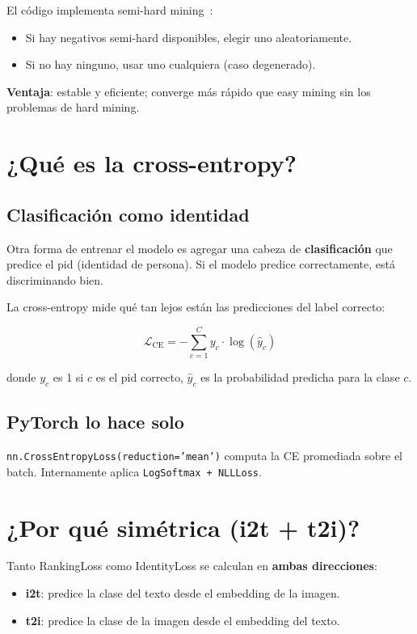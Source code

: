 El código implementa semi-hard mining~\cite{schroff2015facenet}:
\begin{itemize}
  \item Si hay negativos semi-hard disponibles, elegir uno
    aleatoriamente.
  \item Si no hay ninguno, usar uno cualquiera (caso
    degenerado).
\end{itemize}

\noindent\textbf{Ventaja}: estable y eficiente; converge más
rápido que easy mining sin los problemas de hard mining.

\section{¿Qué es la cross-entropy?}

\subsection{Clasificación como identidad}

Otra forma de entrenar el modelo es agregar una cabeza de
\textbf{clasificación} que predice el pid (identidad de persona).
Si el modelo predice correctamente, está discriminando bien.

La cross-entropy mide qué tan lejos están las predicciones del
label correcto:

\begin{equation}
  \mathcal{L}_{\text{CE}} = -\sum_{c=1}^{C} y_c \cdot \log(\hat{y}_c)
  \label{eq:ce}
\end{equation}

\noindent donde $y_c$ es 1 si $c$ es el pid correcto, $\hat{y}_c$ es
la probabilidad predicha para la clase $c$.

\subsection{PyTorch lo hace solo}

\texttt{nn.CrossEntropyLoss(reduction='mean')} computa la CE
promediada sobre el batch. Internamente aplica
\texttt{LogSoftmax + NLLLoss}.

\section{¿Por qué simétrica (i2t + t2i)?}

Tanto RankingLoss como IdentityLoss se calculan en
\textbf{ambas direcciones}:
\begin{itemize}
  \item \textbf{i2t}: predice la clase del texto desde el
    embedding de la imagen.
  \item \textbf{t2i}: predice la clase de la imagen desde el
    embedding del texto.
\end{itemize}

